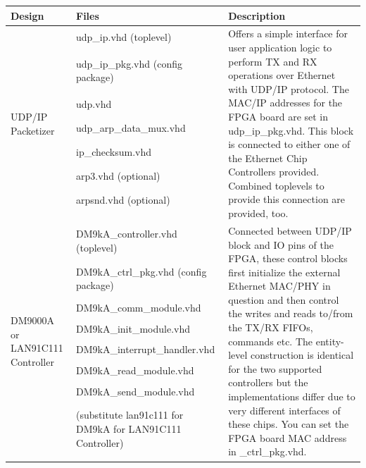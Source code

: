 \documentclass[a4paper,10pt,oneside,final]{article}
\def\deftablecolora{blue!10!white}
\def\deftablecolorb{white}
\begin{document}
\begin{center}

  \begin{tabular}{ | p{3cm} | p{5cm} | p{6cm} | }    %
    \hline
    Design & Files & Description\\
    \hline    
    \multirow{9}{3cm}{UDP/IP Packetizer} & udp\_ip.vhd (toplevel) & \multirow{9}{6cm}{Offers a simple interface for user application logic 
      to perform TX and RX operations over Ethernet with UDP/IP protocol. The MAC/IP addresses for the FPGA board are set in udp\_ip\_pkg.vhd.
      This block is connected to either one of the Ethernet Chip Controllers provided. Combined toplevels to provide this connection are provided, too.} \\
    & udp\_ip\_pkg.vhd (config package) & \\
    & udp.vhd & \\
    & udp\_arp\_data\_mux.vhd & \\
    & ip\_checksum.vhd & \\
    & arp3.vhd (optional) & \\
    & arpsnd.vhd (optional) & \\
    & & \\
    & & \\
    \hline
    \multirow{9}{3cm}{DM9000A or LAN91C111 Controller} & DM9kA\_controller.vhd (toplevel) & \multirow{9}{6cm}{Connected between UDP/IP block and IO pins of
    the FPGA, these control blocks first initialize the external Ethernet MAC/PHY in question and then control the writes and reads to/from the TX/RX
    FIFOs, commands etc. The entity-level construction is identical for the two supported controllers but the implementations differ due to very different
    interfaces of these chips. You can set the FPGA board MAC address in \_ctrl\_pkg.vhd.} \\
    & DM9kA\_ctrl\_pkg.vhd (config package) & \\
    & DM9kA\_comm\_module.vhd & \\
    & DM9kA\_init\_module.vhd & \\
    & DM9kA\_interrupt\_handler.vhd & \\
    & DM9kA\_read\_module.vhd & \\
    & DM9kA\_send\_module.vhd & \\
    & (substitute lan91c111 for DM9kA for LAN91C111 Controller) & \\
    & & \\

\end{tabular}
\end{center}
\end{document}
